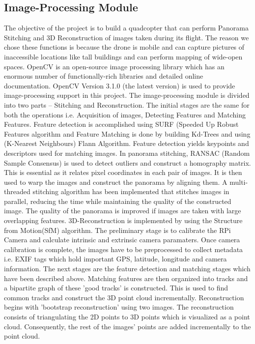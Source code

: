 \subsection{Image-Processing Module}
The objective of the project is to build a quadcopter that can perform Panorama Stitching and 3D Reconstruction of images taken during its flight. The reason we chose these functions is because the drone is mobile and can capture pictures of inaccessible locations like tall buildings and can perform mapping of wide-open spaces.\newline
 OpenCV is an open-source image processing library which has an enormous number of functionally-rich libraries and detailed online documentation. OpenCV  Version 3.1.0 (the latest version) is used to provide image-processing support in this project.
\newline
\newline
The image-processing module is divided into two parts – Stitching and Reconstruction. The initial stages are the same for both the operations i.e. Acquisition of images, Detecting Features and Matching Features. Feature detection is accomplished using SURF (Speeded Up Robust Features  algorithm and Feature Matching is done by building Kd-Trees and using (K-Nearest Neighbours) Flann Algorithm. Feature detection yields keypoints and descriptors used for matching images.
\newline
\newline
In panorama stitching, RANSAC (Random Sample Consensus) is used to detect outliers and construct a homography matrix. This is essential as it relates pixel coordinates in each pair of images. It is then used to warp the images and construct the panorama by aligning them.
A multi-threaded stitching algorithm has been implemented that stitches images in parallel, reducing the time while maintaining the quality of the constructed image. The quality of the panorama is improved if images are taken with large overlapping features.
\newline
\newline
 3D-Reconstruction is implemented by using the Structure from Motion(SfM) algorithm. The preliminary stage is to calibrate the RPi Camera and calculate intrinsic and extrinsic camera paramaters. Once camera calibration is complete, the images have to be preprocessed to collect metadata i.e. EXIF tags which hold important GPS, latitude, longitude and camera information. 
\newline
\newline
 The next stages are the feature detection and matching stages which have been described above. Matching features are then organized into tracks and a bipartite graph of these 'good tracks' is constructed. This is used to find common tracks and construct the 3D point cloud incrementally. Reconstruction begins with 'bootstrap reconstruction' using two images. The reconstruction consists of triangulating the 2D points to 3D points which is visualized as a point cloud. Consequently, the rest of the images' points are added incrementally to the point cloud. 
